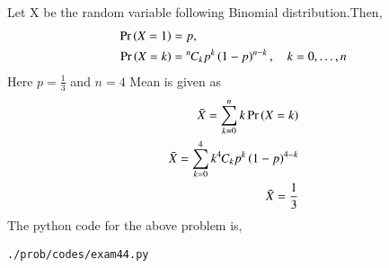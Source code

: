 Let X be the random variable following Binomial distribution.Then,
\begin{align}
\Pr\left(X = 1\right) &= p,
\\
\Pr\left(X = k\right) &= {{}^{n}\mkern-1muC_{k}}p^k\left(1-p\right)^{n-k}, \quad k = 0,\dots, n
\label{eq:exam44_1}
\end{align}
Here $p=\frac{1}{3}$ and $n=4$
Mean is given as
\begin{align}
\bar{X}=\sum_{k=0}^{n} k \Pr\left(X=k\right)
\\
\bar{X}=\sum_{k=0}^{4} k {{}^{4}\mkern-1muC_{k}}p^k \left(1-p\right)^{4-k}
\\
\bar{X}=\frac{1}{3}
\end{align}
The python code for the above problem is,
\begin{lstlisting}
./prob/codes/exam44.py
\end{lstlisting}
